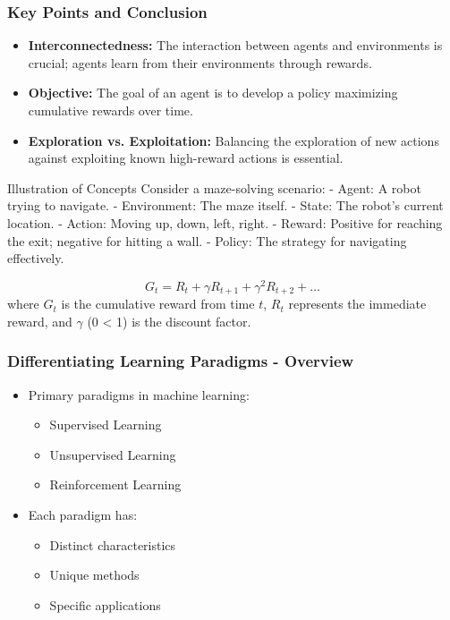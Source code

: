 \documentclass[aspectratio=169]{beamer}
\begin{document}
\begin{frame}[fragile]
    \frametitle{Key Points and Conclusion}
    \begin{itemize}
        \item \textbf{Interconnectedness:} The interaction between agents and environments is crucial; agents learn from their environments through rewards.
        \item \textbf{Objective:} The goal of an agent is to develop a policy maximizing cumulative rewards over time.
        \item \textbf{Exploration vs. Exploitation:} Balancing the exploration of new actions against exploiting known high-reward actions is essential.
    \end{itemize}

    \begin{block}{Illustration of Concepts}
        Consider a maze-solving scenario: 
        - Agent: A robot trying to navigate.
        - Environment: The maze itself.
        - State: The robot's current location.
        - Action: Moving up, down, left, right.
        - Reward: Positive for reaching the exit; negative for hitting a wall.
        - Policy: The strategy for navigating effectively.
    \end{block}

    \begin{equation}
        G_t = R_t + \gamma R_{t+1} + \gamma^2 R_{t+2} + \ldots 
    \end{equation}
    where $G_t$ is the cumulative reward from time $t$, $R_t$ represents the immediate reward, and $\gamma$ (0 \leq \gamma < 1) is the discount factor.
\end{frame}

\begin{frame}[fragile]
    \frametitle{Differentiating Learning Paradigms - Overview}
    \begin{itemize}
        \item Primary paradigms in machine learning:
        \begin{itemize}
            \item Supervised Learning
            \item Unsupervised Learning
            \item Reinforcement Learning
        \end{itemize}
        \item Each paradigm has:
        \begin{itemize}
            \item Distinct characteristics
            \item Unique methods
            \item Specific applications
        \end{itemize}
    \end{itemize}
\end{frame}
\end{document}
